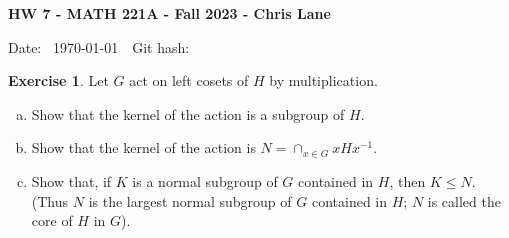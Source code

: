 \documentclass[11pt,oneside]{article}
\numberwithin{equation}{section}
\theoremstyle{definition}
\newtheorem{exercise}{Exercise}
\begin{document}
\textbf{HW 7 - MATH 221A - Fall 2023 - Chris Lane}

Date: \hhmmsstime{} \ \today \ \ Git hash: 


\begin{exercise}
  Let $G$ act on left cosets of $H$ by multiplication.
  \begin{enumerate}[(a)]
  \item
    Show that the kernel of the action is a subgroup of $H$.  
  \item
    Show that the kernel of the action is $N = \cap _{x \in G} xHx^{-1}$.
  \item
    Show that, if $K$ is a normal subgroup of $G$ contained in $H$,
    then $K \leq N$.  (Thus $N$ is the largest normal subgroup of $G$
    contained in $H$; $N$ is called the core of $H$ in $G$).
  \end{enumerate}
\end{exercise}
\end{document}
